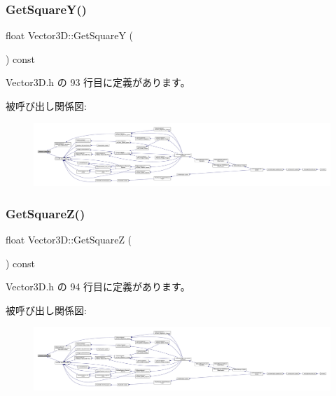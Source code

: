 \subsubsection{\texorpdfstring{Get\+Square\+Y()}{GetSquareY()}}
{\footnotesize\ttfamily float Vector3\+D\+::\+Get\+SquareY (\begin{DoxyParamCaption}{ }\end{DoxyParamCaption}) const\hspace{0.3cm}{\ttfamily [inline]}}



 Vector3\+D.\+h の 93 行目に定義があります。

被呼び出し関係図\+:
\nopagebreak
\begin{figure}[H]
\begin{center}
\leavevmode
\includegraphics[width=350pt]{class_vector3_d_a151d4791ff98d3f99d038c1dc372e0fc_icgraph}
\end{center}
\end{figure}
\mbox{\label{class_vector3_d_a8ede9efe34b69e067153688aea96574f}} 
\subsubsection{\texorpdfstring{Get\+Square\+Z()}{GetSquareZ()}}
{\footnotesize\ttfamily float Vector3\+D\+::\+Get\+SquareZ (\begin{DoxyParamCaption}{ }\end{DoxyParamCaption}) const\hspace{0.3cm}{\ttfamily [inline]}}



 Vector3\+D.\+h の 94 行目に定義があります。

被呼び出し関係図\+:
\nopagebreak
\begin{figure}[H]
\begin{center}
\leavevmode
\includegraphics[width=350pt]{class_vector3_d_a8ede9efe34b69e067153688aea96574f_icgraph}
\end{center}
\end{figure}
\mbox{\label{class_vector3_d_a9cfe261f14b3b2e6704c5649058d3ecd}} 
